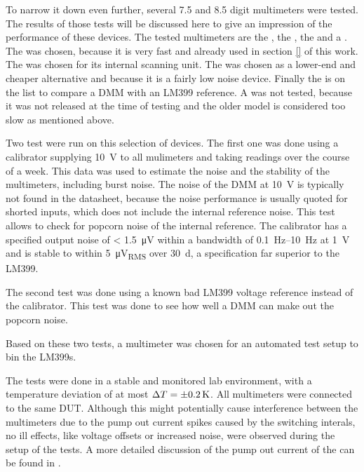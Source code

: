 To narrow it down even further, several \num{7.5} and \num{8.5} digit multimeters were tested. The results of those tests will be discussed here to give an impression of the performance of these devices. The tested multimeters are the , the , the  and a . The  was chosen, because it is very fast and already used in section \ref{} of this work. The  was chosen for its internal scanning unit. The  was chosen as a lower-end and cheaper alternative and because it is a fairly low noise device. Finally the  is on the list to compare a DMM with an LM399 reference. A  was not tested, because it was not released at the time of testing and the older model  is considered too slow as mentioned above.


Two test were run on this selection of devices. The first one was done using a  calibrator supplying \qty{10}{\volt} to all mulimeters and taking readings over the course of a week. This data was used to estimate the noise and the stability of the multimeters, including burst noise. The noise of the DMM at \qty{10}{\volt} is typically not found in the datasheet, because the noise performance is usually quoted for shorted inputs, which does not include the internal reference noise. This test allows to check for popcorn noise of the internal reference. The calibrator has a specified output noise of \qty{< 1.5}{\micro \volt} within a bandwidth of \qtyrange{0.1}{10}{\Hz} at \qty{1}{\volt} and is stable to within \qty{5}{\micro \volt_{RMS}} over \qty{30}{\day}, a specification far superior to the LM399.

The second test was done using a known bad LM399 voltage reference instead of the calibrator. This test was done to see how well a DMM can make out the popcorn noise.

Based on these two tests, a multimeter was chosen for an automated test setup to bin the LM399s.


The tests were done in a stable and monitored lab environment, with a temperature deviation of at most $\Delta T = \qty{\pm 0.2}{\kelvin}$. All multimeters were connected to the same DUT. Although this might potentially cause interference between the multimeters due to the pump out current spikes caused by the switching interals, no ill effects, like voltage offsets or increased noise, were observed during the setup of the tests. A more detailed discussion of the pump out current of the  can be found in \cite{article_3458A_input_mpedance}.


